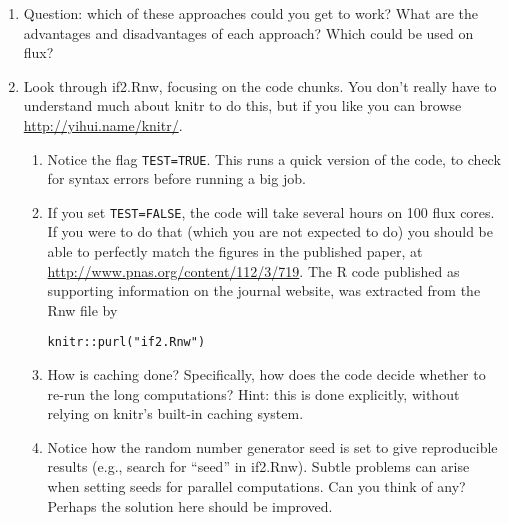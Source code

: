 \documentclass[12pt]{article}
\begin{document}
\begin{enumerate}
\item Question: which of these approaches could you get to work? What are the advantages and disadvantages of each approach? Which could be used on flux?


\item Look through if2.Rnw, focusing on the code chunks. You don't really have to understand much about knitr to do this, but if you like you can browse \url{http://yihui.name/knitr/}.

\begin{enumerate}
\item Notice the flag \texttt{TEST=TRUE}. This runs a quick version of the code, to check for syntax errors before running a big job.
\item If you set \texttt{TEST=FALSE}, the code will take several hours on 100 flux cores. If you were to do that (which you are not expected to do) you should be able to perfectly match the figures in the published paper, at
\url{http://www.pnas.org/content/112/3/719}. The R code published as supporting information on the journal website, was extracted from the Rnw file by 
\begin{verbatim}
knitr::purl("if2.Rnw")
\end{verbatim}

\item How is caching done? Specifically, how does the code decide whether to re-run the long computations? Hint: this is done explicitly, without relying on knitr's built-in caching system.

\item Notice how the random number generator seed is set to give reproducible results (e.g., search for ``seed'' in if2.Rnw). Subtle problems can arise when setting seeds for parallel computations. Can you think of any? Perhaps the solution here should be improved. 

\end{enumerate}
\end{enumerate}
\end{document}
